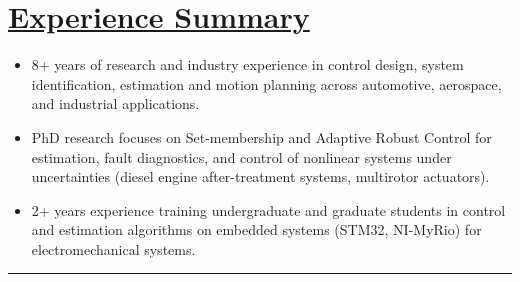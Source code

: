 \section*{\underline{Experience Summary}}
\begin{itemize}
        \item 8+ years of research and industry experience in control design, system identification, estimation and motion planning across automotive, aerospace, and industrial applications.
        \item PhD research focuses on Set-membership and Adaptive Robust Control for estimation, fault diagnostics, and control of nonlinear systems under uncertainties (diesel engine after-treatment systems, multirotor actuators).
        \item 2+ years experience training undergraduate and graduate students in control and estimation algorithms on embedded systems (STM32, NI-MyRio) for electromechanical systems.
\end{itemize}

\noindent\rule{\textwidth}{0.4pt}
